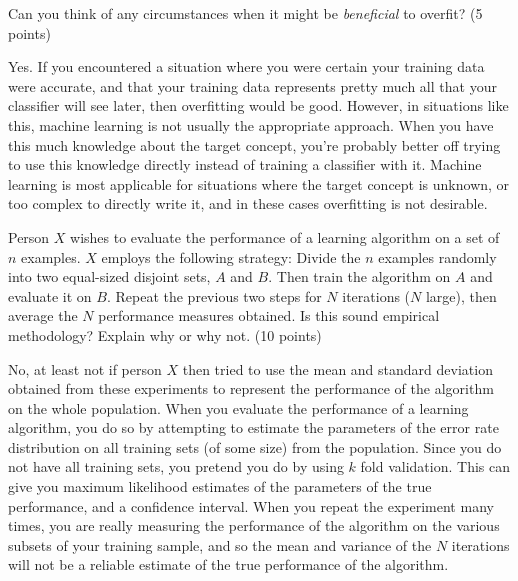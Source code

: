 \documentclass[fleqn]{homework}
\begin{document}
  \maketitle

  \begin{problem}{1}
    \begin{question}
      Can you think of any circumstances when it might be \textit{beneficial} to
      overfit? (5 points)
    \end{question}

    Yes.  If you encountered a situation where you were certain your training
    data were accurate, and that your training data represents pretty much all
    that your classifier will see later, then overfitting would be good.
    However, in situations like this, machine learning is not usually the
    appropriate approach.  When you have this much knowledge about the target
    concept, you're probably better off trying to use this knowledge directly
    instead of training a classifier with it.  Machine learning is most
    applicable for situations where the target concept is unknown, or too
    complex to directly write it, and in these cases overfitting is not
    desirable.
  \end{problem}

  \begin{problem}{2}
    \begin{question}
      Person $X$ wishes to evaluate the performance of a learning algorithm on a
      set of $n$ examples.  $X$ employs the following strategy: Divide the $n$
      examples randomly into two equal-sized disjoint sets, $A$ and $B$.  Then
      train the algorithm on $A$ and evaluate it on $B$.  Repeat the previous
      two steps for $N$ iterations ($N$ large), then average the $N$ performance
      measures obtained.  Is this sound empirical methodology?  Explain why or
      why not. (10 points)
    \end{question}

    No, at least not if person $X$ then tried to use the mean and standard
    deviation obtained from these experiments to represent the performance of
    the algorithm on the whole population.  When you evaluate the performance of
    a learning algorithm, you do so by attempting to estimate the parameters of
    the error rate distribution on all training sets (of some size) from the
    population.  Since you do not have all training sets, you pretend you do by
    using $k$ fold validation.  This can give you maximum likelihood estimates
    of the parameters of the true performance, and a confidence interval.  When
    you repeat the experiment many times, you are really measuring the
    performance of the algorithm on the various subsets of your training sample,
    and so the mean and variance of the $N$ iterations will not be a reliable
    estimate of the true performance of the algorithm.
  \end{problem}
\end{document}
